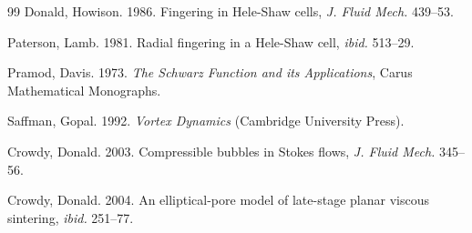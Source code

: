 \documentclass{article}
\begin{document}
\begin{thebibliography}{99}
Donald, Howison. 1986. Fingering in Hele-Shaw cells, {\it J. Fluid Mech.}  439--53.

Paterson, Lamb. 1981. Radial fingering in a Hele-Shaw
cell, {\it ibid.} 513--29.

Pramod, Davis. 1973. {\it The Schwarz Function and its
Applications}, Carus Mathematical Monographs.

Saffman, Gopal. 1992. {\it Vortex Dynamics} (Cambridge University Press).

Crowdy, Donald. 2003. Compressible bubbles in Stokes flows,
{\it J. Fluid Mech.} 345--56.

Crowdy, Donald. 2004. An elliptical-pore model of late-stage planar viscous sintering, {\it ibid.} 251--77.
\end{thebibliography}
\end{document}
